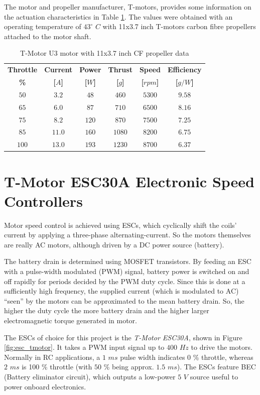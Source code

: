 \documentclass[a4paper]{report}
\begin{document}
The motor and propeller manufacturer, T-motors, provides some information on the actuation characteristics in Table \ref{table:motorManufacturerData}. The values were obtained with an operating temperature of $43^{\circ}$ $C$ with 11x3.7 inch T-motors carbon fibre propellers attached to the motor shaft.

\begin{table}
\begin{tabular}{ |c|c|c|c|c|c| }
\hline
\textbf{Throttle} & \textbf{Current} & \textbf{Power} & \textbf{Thrust} & \textbf{Speed} & \textbf{Efficiency} \\
\textbf{\%} & \textbf{[$A$]} & \textbf{[$W$]} & \textbf{[$g$]} & \textbf{[$rpm$]} & \textbf{[$g/W$]} \\
\hline
$50$ & $3.2$ & $48$ & $460$ & $5300$ & $9.58$ \\
$65$ & $6.0$ & $87$ & $710$ & $6500$ & $8.16$ \\
$75$ & $8.2$ & $120$ & $870$ & $7500$ & $7.25$ \\
$85$ & $11.0$ & $160$ & $1080$ & $8200$ & $6.75$ \\
$100$ & $13.0$ & $193$ & $1230$ & $8700$ & $6.37$ \\
\hline
\end{tabular}
\caption{T-Motor U3 motor with 11x3.7 inch CF propeller data}
\label{table:motorManufacturerData}
\end{table}

	\section{T-Motor ESC30A Electronic Speed Controllers}
Motor speed control is achieved using ESCs, which cyclically shift the coils’ current by applying a three-phase alternating-current. So the motors themselves are really AC motors, although driven by a DC power source (battery).

The battery drain is determined using MOSFET transistors. By feeding an ESC with a pulse-width modulated (PWM) signal, battery power is switched on and off rapidly for periods decided by the PWM duty cycle. Since this is done at a sufficiently high frequency, the supplied current (which is modulated to AC) “seen” by the motors can be approximated to the mean battery drain. So, the higher the duty cycle the more battery drain and the higher larger electromagnetic torque generated in motor.

The ESCs of choice for this project is the \emph{T-Motor ESC30A}, shown in Figure \ref{fig:esc_tmotor}. It takes a PWM input signal up to $400$ $Hz$ to drive the motors. Normally in RC applications, a $1$ $ms$ pulse width indicates $0$ \% throttle, whereas $2$ $ms$ is 100 \% throttle (with $50$ \% being approx. $1.5$ $ms$). The ESCs feature BEC (Battery eliminator circuit), which outputs a low-power $5$ $V$ source useful to power onboard electronics.
\end{document}
